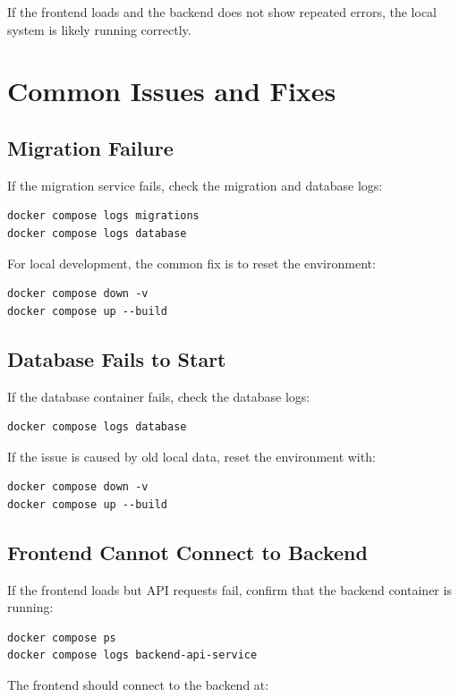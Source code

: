 \documentclass{article}
\begin{document}
If the frontend loads and the backend does not show repeated errors, the local system is likely running correctly.

\section{Common Issues and Fixes}

\subsection{Migration Failure}
If the migration service fails, check the migration and database logs:

\begin{verbatim}
docker compose logs migrations
docker compose logs database
\end{verbatim}

For local development, the common fix is to reset the environment:

\begin{verbatim}
docker compose down -v
docker compose up --build
\end{verbatim}

\subsection{Database Fails to Start}
If the database container fails, check the database logs:

\begin{verbatim}
docker compose logs database
\end{verbatim}

If the issue is caused by old local data, reset the environment with:

\begin{verbatim}
docker compose down -v
docker compose up --build
\end{verbatim}

\subsection{Frontend Cannot Connect to Backend}
If the frontend loads but API requests fail, confirm that the backend container is running:

\begin{verbatim}
docker compose ps
docker compose logs backend-api-service
\end{verbatim}

The frontend should connect to the backend at:
\end{document}
